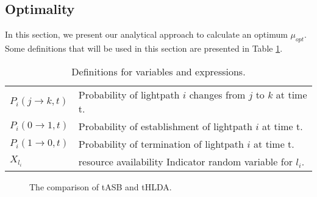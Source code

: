 \documentclass[conference]{IEEEtran}
\begin{document}
\subsection{Optimality}\label{optimality}
In this section, we present our analytical approach to calculate an optimum $\mu_{opt}$.
Some definitions that will be used in this section are presented in Table \ref{definitions}.
\begin{table}[h]
\caption{Definitions for variables and expressions.} \label{definitions}
\begin{tabular}{ll} \hline
$P_i(j\rightarrow k, t)$ & Probability of lightpath $i$ changes from $j$ to $k$ at time t.	\\
$P_i(0\rightarrow 1, t)$ & Probability of  establishment of lightpath $i$ at time t.	\\
$P_i(1\rightarrow 0, t)$ & Probability of  termination of lightpath $i$  at time t.	\\
$X_{l_i}$	& resource availability Indicator random variable for $l_i$.				\\
\hline
 \end{tabular}
\end{table}
 
 \begin{figure*}[t]
  \centering
\def\factor{0.3}
\hfill
\hfill
\hfill
 
  \caption{ The comparison of tASB and tHLDA.} 
\label{reconf}
\end{figure*} 
 
\end{document}
